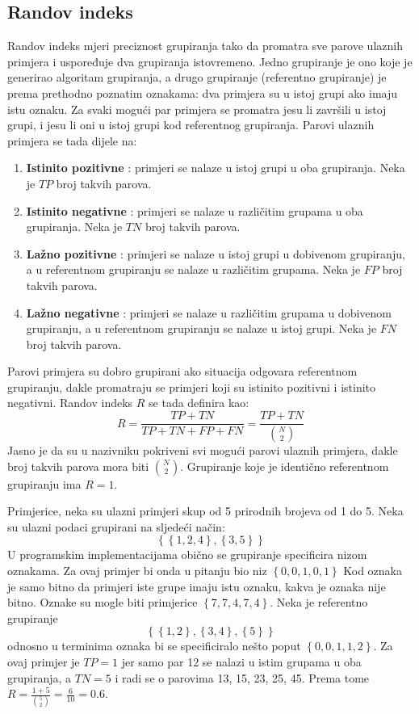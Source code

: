 \documentclass[times, utf8, zavrsni]{fer}
\begin{document}
\subsection{Randov indeks}
Randov indeks mjeri preciznost grupiranja tako da promatra sve parove ulaznih primjera i uspoređuje dva grupiranja istovremeno. Jedno grupiranje je ono koje je generirao algoritam grupiranja, a drugo grupiranje (referentno grupiranje) je prema prethodno poznatim oznakama: dva primjera su u istoj grupi ako imaju istu oznaku. Za svaki mogući par primjera se promatra jesu li završili u istoj grupi, i jesu li oni u istoj grupi kod referentnog grupiranja. Parovi ulaznih primjera se tada dijele na:
\begin{enumerate}
    \item \textbf{Istinito pozitivne} : primjeri se nalaze u istoj grupi u oba grupiranja. Neka je $TP$ broj takvih parova.
    \item \textbf{Istinito negativne} : primjeri se nalaze u različitim grupama u oba grupiranja. Neka je $TN$ broj takvih parova.
    \item \textbf{Lažno pozitivne} : primjeri se nalaze u istoj grupi u dobivenom grupiranju, a u referentnom grupiranju se nalaze u različitim grupama. Neka je $FP$ broj takvih parova.
    \item \textbf{Lažno negativne} : primjeri se nalaze u različitim grupama u dobivenom grupiranju, a u referentnom grupiranju se nalaze u istoj grupi. Neka je $FN$ broj takvih parova.
\end{enumerate}

Parovi primjera su dobro grupirani ako situacija odgovara referentnom grupiranju, dakle promatraju se primjeri koji su istinito pozitivni i istinito negativni.
Randov indeks $R$ se tada definira kao:
\[R = \frac{TP + TN}{TP + TN + FP + FN} = \frac{TP + TN}{\binom{N}{2}}\]
Jasno je da su u nazivniku pokriveni svi mogući parovi ulaznih primjera, dakle broj takvih parova mora biti $\binom{N}{2}$.
Grupiranje koje je identično referentnom grupiranju ima $R = 1$.

Primjerice, neka su ulazni primjeri skup od 5 prirodnih brojeva od 1 do 5. Neka su ulazni podaci grupirani na sljedeći način:
\[\left\{ \left\{1, 2, 4\right\}, \left\{3, 5\right\} \right\}\]
U programskim implementacijama obično se grupiranje specificira nizom oznakama. Za ovaj primjer bi onda u pitanju bio niz $\left\{0, 0, 1, 0, 1\right\}$ Kod oznaka je samo bitno da primjeri iste grupe imaju istu oznaku, kakva je oznaka nije bitno. Oznake su mogle biti primjerice  $\left\{7, 7, 4, 7, 4\right\}$. Neka je referentno grupiranje
\[\left\{\left\{1,2\right\}, \left\{3,4\right\}, \left\{5\right\}\right\}\]
odnosno u terminima oznaka bi se specificiralo nešto poput $\left\{0, 0, 1, 1, 2\right\}$.
Za ovaj primjer je $TP = 1$ jer samo par 12 se nalazi u istim grupama u oba grupiranja, a $TN = 5$ i radi se o parovima 13, 15, 23, 25, 45. Prema tome $R = \frac{1 + 5}{\binom{5}{2}} = \frac{6}{10} = 0.6$.
\end{document}
